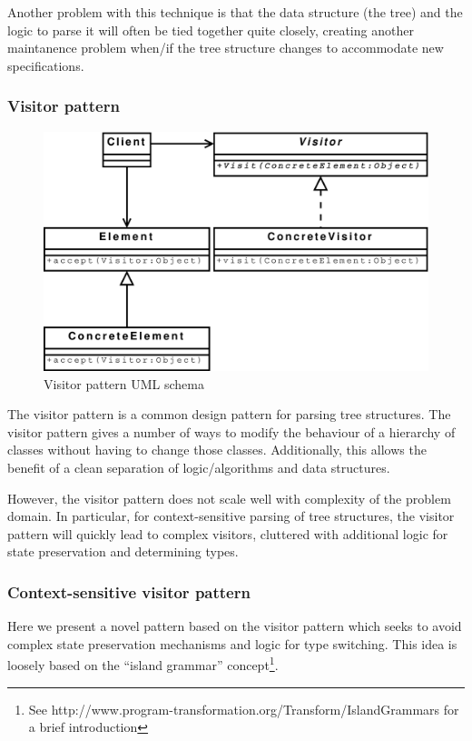 Another problem with this technique is that the data structure (the tree) and
the logic to parse it will often be tied together quite closely, creating
another maintanence problem when/if the tree structure changes to
accommodate new specifications.

\subsubsection{Visitor pattern}
\label{sect:theory:visitorPattern}

\begin{figure}[h]
  \centering
    \includegraphics[scale=0.40]{diagrams/visitor_pattern} 
  \caption{Visitor pattern UML schema}
  \label{figure:parser:visitor_pattern}
\end{figure}

The visitor pattern\cite{agile_software} is a common design pattern for parsing
tree structures. The visitor pattern gives a number of ways to modify the
behaviour of a hierarchy of classes without having to change those classes.
Additionally, this allows the benefit of a clean separation of logic/algorithms
and data structures.

However, the visitor pattern does not scale well with complexity of the problem
domain. In particular, for context-sensitive parsing of tree structures, the
visitor pattern will quickly lead to complex visitors, cluttered with
additional logic for state preservation and determining types.  

\subsubsection{Context-sensitive visitor pattern}
\label{sect:theory:contextVisitorPattern}
Here we present a novel pattern based on the visitor pattern which seeks to
avoid complex state preservation mechanisms and logic for type switching. This idea
is loosely based on the ``island grammar'' concept\cite{islandGrammar}\footnote{See
http://www.program-transformation.org/Transform/IslandGrammars for a brief
introduction}.

